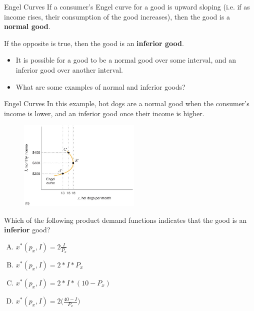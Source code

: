 \documentclass[11pt,t]{beamer}
\begin{document}
\begin{frame}{Engel Curves}
  If a consumer's Engel curve for a good is upward sloping (i.e. if as income rises, their consumption of the good increases), then the good is a \textbf{normal good}.

  \bigskip
  If the opposite is true, then the good is an \textbf{inferior good}.

  \bigskip\pause
  \begin{itemize}
    \item It is possible for a good to be a normal good over some interval, and an inferior good over another interval.

    \item What are some examples of normal and inferior goods?
  \end{itemize}
\end{frame}

\begin{frame}{Engel Curves}
In this example, hot dogs are a normal good when the consumer's income is lower, and an inferior good once their income is higher.
\begin{figure}
  \includegraphics[width=220px]{figures/fig5_4b.jpg}
\end{figure}
\end{frame}

\begin{frame}

  \bigskip 
  Which of the following product demand functions indicates that the good is an \textbf{inferior} good?

  \bigskip
  \begin{enumerate}[A)]
    \item $x^*(p_x, I) = 2\frac{I}{P_x}$
    \item $x^*(p_x, I) =  2*I*P_x$ 
    \item $x^*(p_x, I) =  2*I*(10-P_x)$
    \item $x^*(p_x, I) =  2\big(\frac{40-I}{P_x}\big)$
  \end{enumerate}
\end{frame}
\end{document}

